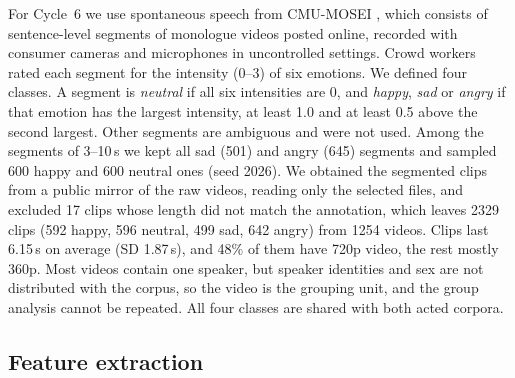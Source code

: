 For Cycle~6 we use spontaneous speech from CMU-MOSEI \citep{zadeh2018}, which consists of sentence-level segments of monologue videos posted online, recorded with consumer cameras and microphones in uncontrolled settings. Crowd workers rated each segment for the intensity (0--3) of six emotions. We defined four classes. A segment is \emph{neutral} if all six intensities are 0, and \emph{happy}, \emph{sad} or \emph{angry} if that emotion has the largest intensity, at least 1.0 and at least 0.5 above the second largest. Other segments are ambiguous and were not used. Among the segments of 3--10\,s we kept all sad (501) and angry (645) segments and sampled 600 happy and 600 neutral ones (seed 2026). We obtained the segmented clips from a public mirror of the raw videos, reading only the selected files, and excluded 17 clips whose length did not match the annotation, which leaves 2329 clips (592 happy, 596 neutral, 499 sad, 642 angry) from 1254 videos. Clips last 6.15\,s on average (SD 1.87\,s), and 48\% of them have 720p video, the rest mostly 360p. Most videos contain one speaker, but speaker identities and sex are not distributed with the corpus, so the video is the grouping unit, and the group analysis cannot be repeated. All four classes are shared with both acted corpora.

\subsection{Feature extraction}

